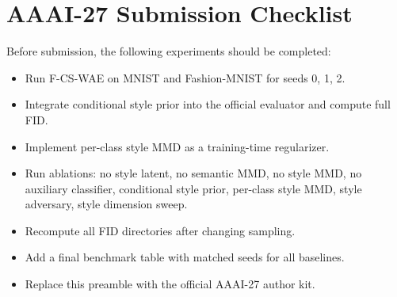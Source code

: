 \documentclass[10pt]{article}
\newcommand{\ours}{F-CS-WAE}
\begin{document}
\section{AAAI-27 Submission Checklist}

Before submission, the following experiments should be completed:
\begin{itemize}
    \item Run \ours{} on MNIST and Fashion-MNIST for seeds 0, 1, 2.
    \item Integrate conditional style prior into the official evaluator and compute full FID.
    \item Implement per-class style MMD as a training-time regularizer.
    \item Run ablations: no style latent, no semantic MMD, no style MMD, no auxiliary classifier, conditional style prior, per-class style MMD, style adversary, style dimension sweep.
    \item Recompute all FID directories after changing sampling.
    \item Add a final benchmark table with matched seeds for all baselines.
    \item Replace this preamble with the official AAAI-27 author kit.
\end{itemize}
\end{document}
